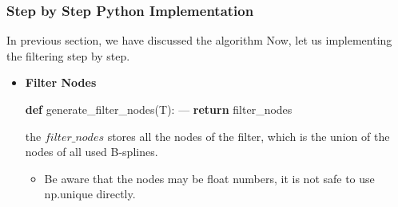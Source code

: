 \documentclass[11pt]{article}
\providecommand{\tightlist}{%
      \setlength{\itemsep}{0pt}\setlength{\parskip}{0pt}}
\newenvironment{Shaded}{}{}
\newcommand{\KeywordTok}[1]{\textcolor[rgb]{0.00,0.44,0.13}{\textbf{{#1}}}}
\newcommand{\NormalTok}[1]{{#1}}
\newcommand{\ControlFlowTok}[1]{\textcolor[rgb]{0.00,0.44,0.13}{\textbf{{#1}}}}
\newcommand{\OperatorTok}[1]{\textcolor[rgb]{0.40,0.40,0.40}{{#1}}}
\begin{document}
    \subsubsection{Step by Step Python
Implementation}\label{step-by-step-python-implementation}

In previous section, we have discussed the algorithm Now, let us
implementing the filtering step by step.

\begin{itemize}
\item
  \textbf{Filter Nodes}

\begin{Shaded}
\begin{Highlighting}[]
\KeywordTok{def}\NormalTok{ generate_filter_nodes(T):}
        \OperatorTok{---}
    \ControlFlowTok{return}\NormalTok{ filter_nodes}
\end{Highlighting}
\end{Shaded}

  the \(filter\_nodes\) stores all the nodes of the filter, which is the
  union of the nodes of all used B-splines.

  \begin{itemize}
  \tightlist
  \item
    Be aware that the nodes may be float numbers, it is not safe to use
    np.unique directly.
  \end{itemize}
\end{itemize}
\end{document}
